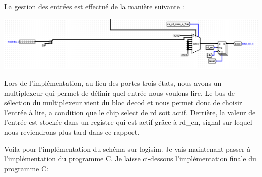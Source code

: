 La gestion des entrées est effectué de la manière suivante : \\
\begin{center}
\includegraphics[scale=0.6]{./images/Entree_partie1.png}\\\par
{}
\end{center}\par
Lors de l'implémentation, au lieu des portes trois états, nous avons un multiplexeur qui permet de définir quel entrée nous voulons lire. Le bus de sélection du multiplexeur vient du bloc decod et nous permet donc de choisir l'entrée à lire, a condition que le chip select de rd soit actif. Derrière, la valeur de l'entrée est stockée dans un registre qui est actif grâce à rd\_en, signal sur lequel nous reviendrons plus tard dans ce rapport.\\\par

Voila pour l'implémentation du schéma sur logisim. Je vais maintenant passer à l'implémentation du programme C. Je laisse ci-dessous l'implémentation finale du programme C:

